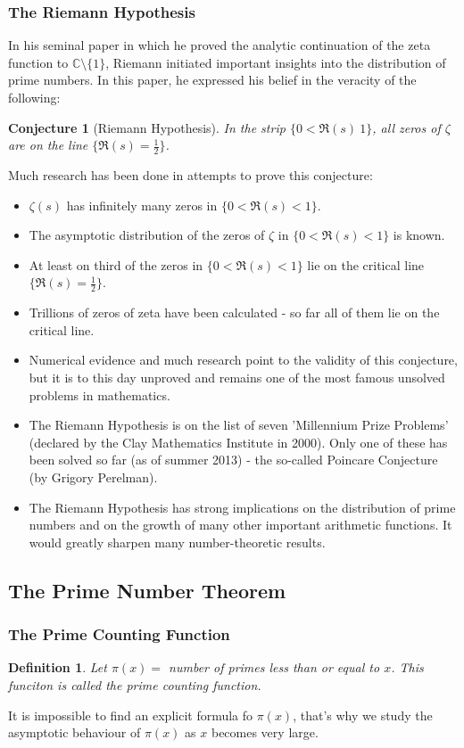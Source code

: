 \documentclass{article}
\newtheorem{definition}{Definition}[section]
\newtheorem{conjecture}{Conjecture}[section]
\begin{document}
\subsubsection{The Riemann Hypothesis}
In his seminal paper in which he proved the analytic continuation of the zeta function to $\mathbb{C} \setminus \{1\}$, Riemann initiated important insights into the distribution of prime numbers. In this paper, he expressed his belief in the veracity of the following:
\begin{conjecture}[Riemann Hypothesis]
In the strip $\{ 0 < \Re (s) \ 1 \}$, all zeros of $\zeta$ are on the line $\{ \Re (s) = \frac{1}{2} \}$.
\end{conjecture}
Much research has been done in attempts to prove this conjecture:
\begin{itemize}
\item $\zeta(s)$ has infinitely many zeros in $\{ 0 < \Re (s) < 1 \}$.
\item The asymptotic distribution of the zeros of $\zeta$ in $\{ 0 < \Re (s) < 1 \}$ is known.
\item At least on third of the zeros in $\{ 0 < \Re (s) < 1 \}$ lie on the critical line $\{ \Re(s) = \frac{1}{2} \}$.
\item Trillions of zeros of zeta have been calculated - so far all of them lie on the critical line.
\item Numerical evidence and much research point to the validity of this conjecture, but it is to this day unproved and remains one of the most famous unsolved problems in mathematics.
\item The Riemann Hypothesis is on the list of seven 'Millennium Prize Problems' (declared by the Clay Mathematics Institute in 2000). Only one of these has been solved so far (as of summer 2013) - the so-called Poincare Conjecture (by Grigory Perelman).
\item The Riemann Hypothesis has strong implications on the distribution of prime numbers and on the growth of many other important arithmetic functions. It would greatly sharpen many number-theoretic results.
\end{itemize}

\subsection{The Prime Number Theorem}

\subsubsection{The Prime Counting Function}
\begin{definition}
Let $\pi(x) = $ number of primes less than or equal to $x$. This funciton is called the prime counting function.
\end{definition}
It is impossible to find an explicit formula fo $\pi(x)$, that's why we study the asymptotic behaviour of $\pi(x)$ as $x$ becomes very large.
\end{document}
